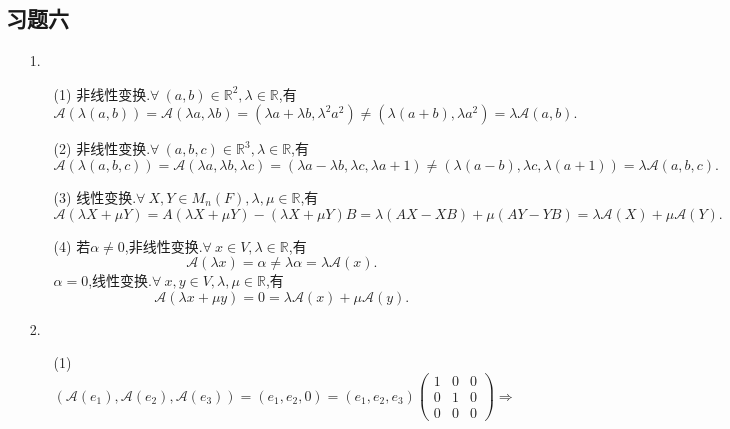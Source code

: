 \documentclass{article}
\begin{document}
\subsection{习题六}
\begin{enumerate}
    \item [1.]\begin{enumerate}
        \item [(1)]非线性变换.$\forall\ (a,b)\in \mathbb{R}^2,\lambda \in \mathbb{R}$,有
        \[
            \mathcal{A} \left(\lambda (a,b)\right)=
            \mathcal{A} \left( \lambda a,\lambda b \right)=
            (\lambda a+\lambda b,\lambda^2 a^2)\neq (\lambda (a+b),\lambda a^2)=\lambda \mathcal{A}(a,b).
        \]
        \item [(2)]非线性变换.$\forall\ (a,b,c)\in \mathbb{R}^3,\lambda \in \mathbb{R}$,有
        \[
            \mathcal{A} \left(\lambda (a,b,c)\right)=
            \mathcal{A} \left( \lambda a,\lambda b,\lambda c \right)=
            (\lambda a-\lambda b,\lambda c,\lambda a +1)\neq (\lambda (a-b),\lambda c,\lambda(a+1))=\lambda \mathcal{A}(a,b,c).
        \]
        \item [(3)]线性变换.$\forall\ X,Y\in M_n(F),\lambda,\mu \in \mathbb{R}$,有
        \[
            \mathcal{A}(\lambda X+\mu Y)
            =A(\lambda X+\mu Y)-(\lambda X+\mu Y)B
            =\lambda (AX-XB)+\mu (AY-YB)
            =\lambda\mathcal{A}(X) +\mu\mathcal{A}(Y).
        \]
        \item [(4)]若$\alpha\neq 0$,非线性变换.$\forall\ x\in V,\lambda \in \mathbb{R}$,有
        \[
            \mathcal{A} \left(\lambda x \right)=\alpha
            \neq \lambda \alpha=\lambda \mathcal{A}(x).
        \]
        $\alpha= 0$,线性变换.$\forall\ x,y\in V,\lambda,\mu \in \mathbb{R}$,有
        \[
            \mathcal{A} \left(\lambda x+\mu y \right)=0
            =\lambda \mathcal{A}(x)+\mu \mathcal{A}(y).
        \]
    \end{enumerate}
    \item [2.]\begin{enumerate}
        \item [(1)]
        \[
            \left(\mathcal{A}(e_1),\mathcal{A}(e_2),\mathcal{A}(e_3) \right)=(e_1,e_2,0)=
            (e_1,e_2,e_3)
            \begin{pmatrix}
                1 & 0 & 0\\
                0 & 1 & 0\\
                0 & 0 & 0
            \end{pmatrix}
            \Rightarrow\quad
\]
\end{enumerate}
\end{enumerate}
\end{document}
